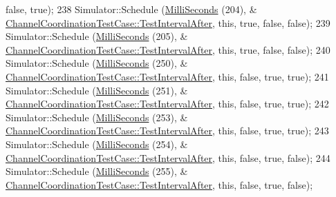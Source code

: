 \begin{DoxyCode}
{      false}, \textcolor{keyword}{true});
238   Simulator::Schedule (\hyperlink{group__timecivil_gaf26127cf4571146b83a92ee18679c7a9}{MilliSeconds} (204), &
      \hyperlink{classChannelCoordinationTestCase_a5a6891984b8599dbffd80e80b6faf92a}{ChannelCoordinationTestCase::TestIntervalAfter}, \textcolor{keyword}{this}, \textcolor{keyword}{true}, \textcolor{keyword}{
      false}, \textcolor{keyword}{false});
239   Simulator::Schedule (\hyperlink{group__timecivil_gaf26127cf4571146b83a92ee18679c7a9}{MilliSeconds} (205), &
      \hyperlink{classChannelCoordinationTestCase_a5a6891984b8599dbffd80e80b6faf92a}{ChannelCoordinationTestCase::TestIntervalAfter}, \textcolor{keyword}{this}, \textcolor{keyword}{true}, \textcolor{keyword}{
      false}, \textcolor{keyword}{false});
240   Simulator::Schedule (\hyperlink{group__timecivil_gaf26127cf4571146b83a92ee18679c7a9}{MilliSeconds} (250), &
      \hyperlink{classChannelCoordinationTestCase_a5a6891984b8599dbffd80e80b6faf92a}{ChannelCoordinationTestCase::TestIntervalAfter}, \textcolor{keyword}{this}, \textcolor{keyword}{false}, \textcolor{keyword}{
      true}, \textcolor{keyword}{true});
241   Simulator::Schedule (\hyperlink{group__timecivil_gaf26127cf4571146b83a92ee18679c7a9}{MilliSeconds} (251), &
      \hyperlink{classChannelCoordinationTestCase_a5a6891984b8599dbffd80e80b6faf92a}{ChannelCoordinationTestCase::TestIntervalAfter}, \textcolor{keyword}{this}, \textcolor{keyword}{false}, \textcolor{keyword}{
      true}, \textcolor{keyword}{true});
242   Simulator::Schedule (\hyperlink{group__timecivil_gaf26127cf4571146b83a92ee18679c7a9}{MilliSeconds} (253), &
      \hyperlink{classChannelCoordinationTestCase_a5a6891984b8599dbffd80e80b6faf92a}{ChannelCoordinationTestCase::TestIntervalAfter}, \textcolor{keyword}{this}, \textcolor{keyword}{false}, \textcolor{keyword}{
      true}, \textcolor{keyword}{true});
243   Simulator::Schedule (\hyperlink{group__timecivil_gaf26127cf4571146b83a92ee18679c7a9}{MilliSeconds} (254), &
      \hyperlink{classChannelCoordinationTestCase_a5a6891984b8599dbffd80e80b6faf92a}{ChannelCoordinationTestCase::TestIntervalAfter}, \textcolor{keyword}{this}, \textcolor{keyword}{false}, \textcolor{keyword}{
      true}, \textcolor{keyword}{false});
244   Simulator::Schedule (\hyperlink{group__timecivil_gaf26127cf4571146b83a92ee18679c7a9}{MilliSeconds} (255), &
      \hyperlink{classChannelCoordinationTestCase_a5a6891984b8599dbffd80e80b6faf92a}{ChannelCoordinationTestCase::TestIntervalAfter}, \textcolor{keyword}{this}, \textcolor{keyword}{false}, \textcolor{keyword}{
      true}, \textcolor{keyword}{false});

\end{DoxyCode}
